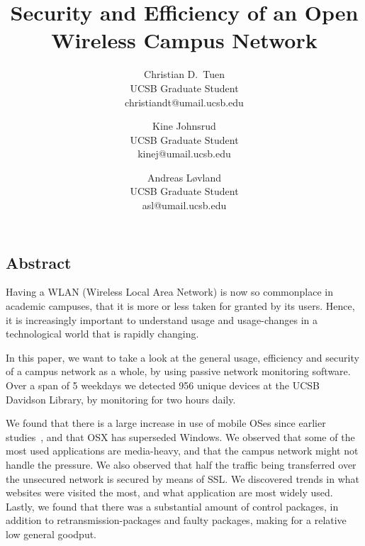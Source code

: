\documentclass[letterpaper,twocolumn,10pt]{article}
\begin{document}
\date{}

\title{\Large \bf Security and Efficiency of an Open Wireless Campus Network}

\author{
{\rm Christian D.\ Tuen}\\
UCSB Graduate Student\\
christiandt@umail.ucsb.edu
\and
{\rm Kine Johnsrud}\\
UCSB Graduate Student\\
kinej@umail.ucsb.edu
\and
{\rm Andreas L\o{}vland}\\
UCSB Graduate Student\\
asl@umail.ucsb.edu
}
\maketitle

\thispagestyle{empty}

\subsection*{Abstract}
Having a WLAN (Wireless Local Area Network) is now so commonplace in academic campuses, that it is more or less taken for granted by its users. Hence, it is increasingly important to understand usage and usage-changes in a technological world that is rapidly changing.

In this paper, we want to take a look at the general usage, efficiency and security of a campus network as a whole, by using passive network monitoring software. Over a span of 5 weekdays we detected 956 unique devices at the UCSB Davidson Library, by monitoring for two hours daily.

We found that there is a large increase in use of mobile OSes since earlier studies~\cite{Campus2004}, and that OSX has superseded Windows. We observed that some of the most used applications are media-heavy, and that the campus network might not handle the pressure. We also observed that half the traffic being transferred over the unsecured network is secured by means of SSL. We discovered trends in what websites were visited the most, and what application are most widely used. Lastly, we found that there was a substantial amount of control packages, in addition to retransmission-packages and faulty packages, making for a relative low general goodput.
\end{document}
